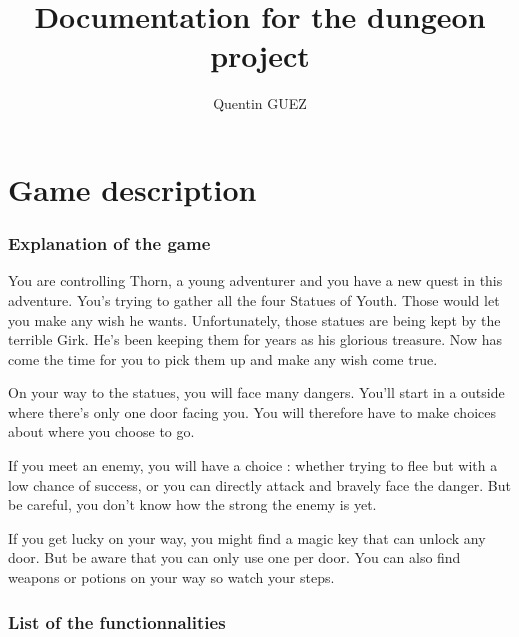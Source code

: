 \documentclass[17pt]{extarticle}
\title{\Huge{Documentation for the dungeon project}}
\author{Quentin GUEZ}
\date{}
\begin{document}
\maketitle

\clearpage

\part{Game description}

\section{Explanation of the game}

You are controlling Thorn, a young adventurer and you have a new quest in this adventure. You's trying to gather all the four Statues of Youth. Those would let you make any wish he wants. Unfortunately, those statues are being kept by the terrible Girk. He's been keeping them for years as his glorious treasure. Now has come the time for you to pick them up and make any wish come true.

On your way to the statues, you will face many dangers. You'll start in a outside where there's only one door facing you. You will therefore have to make choices about where you choose to go. 

If you meet an enemy, you will have a choice : whether trying to flee but with a low chance of success, or you can directly attack and bravely face the danger. But be careful, you don't know how the strong the enemy is yet. 

If you get lucky on your way, you might find a magic key that can unlock any door. But be aware that you can only use one per door. You can also find weapons or potions on your way so watch your steps.

\section{List of the functionnalities}
\end{document}

